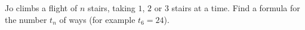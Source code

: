 Jo climbs a flight of $n$ stairs, taking $1$, $2$ or $3$ stairs at a time. Find a formula for the number $t_n$ of ways (for example $t_6=24$).
